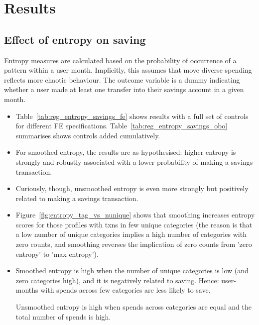 
\section{Results}%
\label{sec:results}

\subsection{Effect of entropy on saving}%
\label{sub:effect_of_entropy_on_saving}

Entropy measures are calculated based on the probability of occurrence of a
pattern within a user month. Implicitly, this assumes that move diverse
spending reflects more chaotic behaviour. The outcome variable is a dummy
indicating whether a user made at least one transfer into their savings account
in a given month.

\begin{itemize}

    \item Table~\ref{tab:reg_entropy_savings_fe} shows results with a full set
        of controls for different FE specifications.
        Table~\ref{tab:reg_entropy_savings_obo} summarises shows controls added
        cumulatively.

    \item For smoothed entropy, the results are as hypothesised: higher entropy
        is strongly and robustly associated with a lower probability of making
        a savings transaction.

    \item Curiously, though, unsmoothed entropy is even more strongly but
        positively related to making a savings transaction.

    \item Figure~\ref{fig:entropy_tag_vs_nunique} shows that smoothing
        increases entropy scores for those profiles with txns in few unique
        categories (the reason is that a low number of unique categories
        implies a high number of categories with zero counts, and smoothing
        reverses the implication of zero counts from 'zero entropy' to 'max
        entropy').

    \item Smoothed entropy is high when the number of unique categories is low
        (and zero categories high), and it is negatively related to saving.
        Hence: user-months with spends across few categories are less likely to
        save.

        Unsmoothed entropy is high when spends across categories are equal and
        the total number of spends is high.





\end{itemize}

